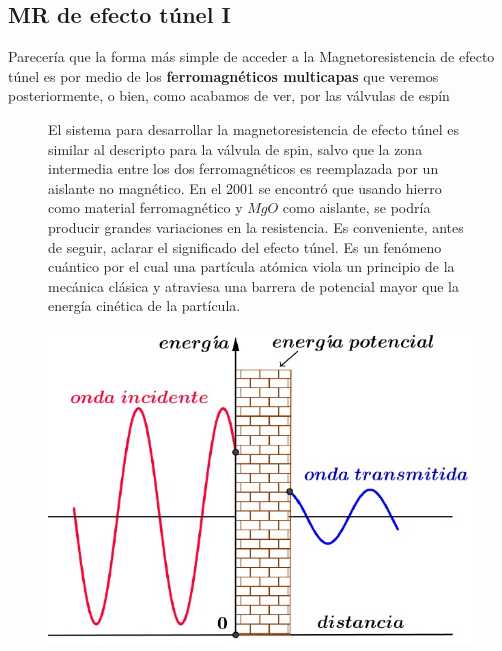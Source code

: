 \subsection{MR de efecto túnel I}

Parecería que la forma más simple de acceder a la Magnetoresistencia de efecto túnel es por medio de los \textbf{ferromagnéticos multicapas} que veremos posteriormente, o bien, como acabamos de ver, por las válvulas de espín

\begin{figure}[H]
  \begin{minipage}[b]{0.47\textwidth}
El sistema para desarrollar la magnetoresistencia de efecto túnel es similar al
descripto para la válvula de spin, salvo que la zona intermedia entre los dos ferromagnéticos es reemplazada por un aislante no magnético. En el 2001 se encontró que usando hierro como material ferromagnético y $MgO$ como aislante, se podría
producir grandes variaciones en la resistencia. Es conveniente, antes de seguir, aclarar el significado del efecto túnel. Es un fenómeno cuántico por el cual una partícula atómica viola un principio de la mecánica clásica y atraviesa una barrera de potencial mayor que la energía cinética de la partícula.

  \vspace{0cm}
  \end{minipage}
  \hfill
  \begin{minipage}[b]{0.47\textwidth}
     \includegraphics[width=1.0\textwidth]{./Figures/fig340}
	\label{fig:340}
	  \vspace{2cm}
  \end{minipage}
\end{figure}


